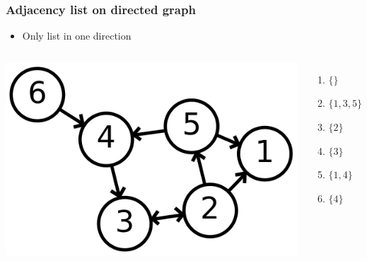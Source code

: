 \documentclass[12pt]{beamer}
\begin{document}
\begin{frame}
\frametitle{Adjacency list on directed graph}
\begin{itemize}
\item Only list in one direction
\end{itemize}
\begin{columns}
\flushright
\includegraphics[width=0.75\linewidth]{img/6n-directed}
\begin{enumerate}
\item $\{\}$
\item $\{1,3,5\}$
\item $\{2\}$
\item $\{3\}$
\item $\{1,4\}$
\item $\{4\}$
\end{enumerate}
\end{columns}
\end{frame}
\end{document}
